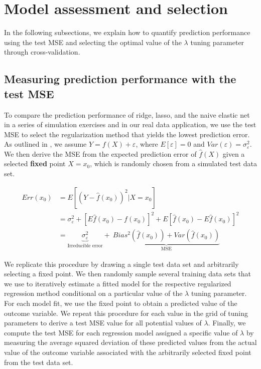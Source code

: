 \section{Model assessment and selection}
\label{section:mse}

In the following subsections, we explain how to quantify prediction performance using the test MSE and selecting the optimal value of the $\lambda$ tuning parameter through cross-validation.    

\subsection{Measuring prediction performance with the test MSE} 

\noindent To compare the prediction performance of ridge, lasso, and the naive elastic net in a series of simulation exercises and in our real data application, we use the test MSE to select the regularization method that yields the lowest prediction error. As outlined in \cite{hastie2008elements}, we assume $Y=f(X) + \varepsilon$, where $E[\varepsilon]=0$ and $Var(\varepsilon)=\sigma^2_{\varepsilon}$. We then derive the MSE from the expected prediction error of $\hat{f}(X)$ given a selected \textbf{fixed} point $X = x_0$, which is randomly chosen from a simulated test data set. 

\begin{align}
\label{eqn:expectedprederr}
Err(x_0) &= E[(Y-\hat{f}(x_0))^2|X=x_0] \\
&= \sigma^2_{\varepsilon} + [E\hat{f}(x_0) -f(x_0)]^2 + E[\hat{f}(x_0) - E\hat{f}(x_0)]^2 \\
&= \underbrace{\sigma^2_{\varepsilon}}_\text{Irreducible error} + \: \underbrace{Bias^2(\hat{f}(x_0))+ Var(\hat{f}(x_0))}_\text{MSE}
\end{align}  

\noindent We replicate this procedure by drawing a single test data set and arbitrarily selecting a fixed point. We then randomly sample several training data sets that we use to iteratively estimate a fitted model for the respective regularized regression method conditional on a particular value of the $\lambda$ tuning parameter. For each model fit, we use the fixed point to obtain a predicted value of the outcome variable. We repeat this procedure for each value in the grid of tuning parameters to derive a test MSE value for all potential values of $\lambda$. Finally, we compute the test MSE for each regression model assigned a specific value of $\lambda$ by measuring the average squared deviation of these predicted values from the actual value of the outcome variable associated with the arbitrarily selected fixed point from the test data set. \\

